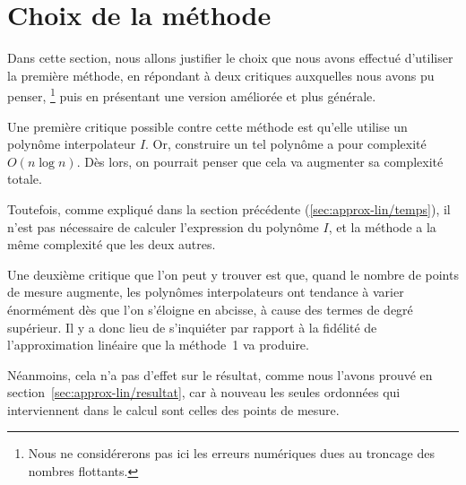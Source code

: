 \section{Choix de la méthode}

Dans cette section, nous allons justifier
le choix que nous avons effectué d'utiliser la première méthode,
en répondant à deux critiques auxquelles nous avons pu penser,%
\footnote{
    Nous ne considérerons pas ici les erreurs numériques
    dues au troncage des nombres flottants.
}
puis en présentant une version améliorée et plus générale.

Une première critique possible contre cette méthode
est qu'elle utilise un polynôme interpolateur $I$.
Or, construire un tel polynôme a pour complexité $O(n\log n)$.
\cite{lagrange-complexity}
Dès lors, on pourrait penser que cela va augmenter sa complexité totale.

Toutefois, comme expliqué dans la section précédente
(\ref{sec:approx-lin/temps}),
il n'est pas nécessaire de calculer l'expression du polynôme $I$,
et la méthode a la même complexité que les deux autres.

Une deuxième critique que l'on peut y trouver est que,
quand le nombre de points de mesure augmente,
les polynômes interpolateurs ont tendance à varier énormément
dès que l'on s'éloigne en abcisse,
à cause des termes de degré supérieur.
Il y a donc lieu de s'inquiéter par rapport à la fidélité
de l'approximation linéaire que la méthode~1 va produire.

Néanmoins, cela n'a pas d'effet sur le résultat, comme nous l'avons
prouvé en section~\ref{sec:approx-lin/resultat},
car à nouveau les seules ordonnées qui interviennent dans le calcul
sont celles des points de mesure.

